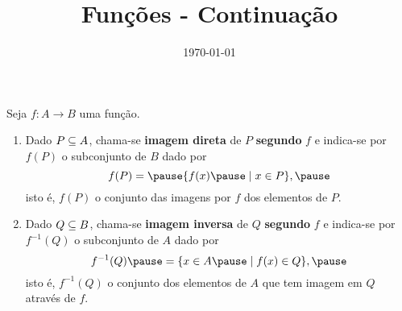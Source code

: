 \documentclass{beamer}
\title{Fun\c{c}\~oes - Continuação}
\author[\autor]{\autor}
\institute[\instituto]{\instituto}
\date{\today}
\begin{document}
    \begin{frame}
        \maketitle
    \end{frame}

    
    \begin{frame}
        \begin{definicao}
            Seja $f : A \to B$ \pause uma fun{\c c}{\~a}o.\pause
            \begin{enumerate}[label={\roman*})]
                \item Dado $P \subseteq A$, \pause chama-se \textbf{imagem direta} \pause de $P$ \pause \textbf{segundo} $f$ \pause e indica-se por $f(P)$ \pause o subconjunto de $B$ \pause dado por\pause
                \[
                    f(P) = \pause \{f(x) \pause \mid x \in P\},\pause
                \]
                isto {\'e}, \pause $f(P)$  o conjunto das imagens por $f$ \pause dos elementos de $P$.\pause
                
                \vspace{.5cm}

                \item Dado $Q \subseteq B$, \pause chama-se \textbf{imagem inversa} \pause de $Q$ \textbf{segundo} $f$ \pause e indica-se por \pause $f^{-1}(Q)$ \pause o subconjunto de $A$ \pause dado por\pause
                \[
                    f^{-1}(Q) \pause = \{x \in A \pause \mid f(x) \in Q\},\pause
                \]
                isto {\'e}, \pause $f^{-1}(Q)$  o conjunto dos elementos de $A$ \pause que tem imagem em $Q$ \pause atrav{\'e}s de $f$.\pause
            \end{enumerate}
        \end{definicao}
    \end{frame}

    \begin{frame}
        \vspace{5cm}
    \end{frame}

    \begin{frame}
        \vspace{5cm}
    \end{frame}
\end{document}
